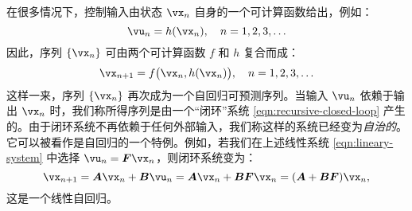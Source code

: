 \documentclass[../../book-main_zh.tex]{subfiles}
\begin{document}
在很多情况下，控制输入由状态 $\vx_n$ 自身的一个可计算函数给出，例如：
\begin{equation}
    \vu_n = h(\vx_n), \quad n =  1, 2, 3, \ldots 
\end{equation}
因此，序列 $\{\vx_n\}$ 可由两个可计算函数 $f$ 和 $h$ 复合而成：
\begin{equation}
    \vx_{n+1} = f\big(\vx_{n}, h(\vx_n)\big), \quad n =  1, 2, 3, \ldots
    \label{eqn:recursive-closed-loop}
\end{equation}
这样一来，序列 $\{\vx_n\}$ 再次成为一个自回归可预测序列。当输入 $\vu_n$ 依赖于输出 $\vx_n$ 时，我们称所得序列是由一个“闭环”系统 \eqref{eqn:recursive-closed-loop} 产生的。由于闭环系统不再依赖于任何外部输入，我们称这样的系统已经变为{\em 自治的}。它可以被看作是自回归的一个特例。例如，若我们在上述线性系统 \eqref{eqn:lineary-system} 中选择 $\vu_n = \boldsymbol{F}\vx_n$，则闭环系统变为：
\begin{equation}
        \vx_{n+1} = \boldsymbol{A}\vx_n + \boldsymbol{B}\vu_n = \boldsymbol{A}\vx_n + \boldsymbol{B}\boldsymbol{F}\vx_n = (\boldsymbol{A}+ \boldsymbol{B}\boldsymbol{F})\vx_n,
    \label{eqn:lineary-system-closed}
\end{equation}
这是一个线性自回归。

\end{document}
